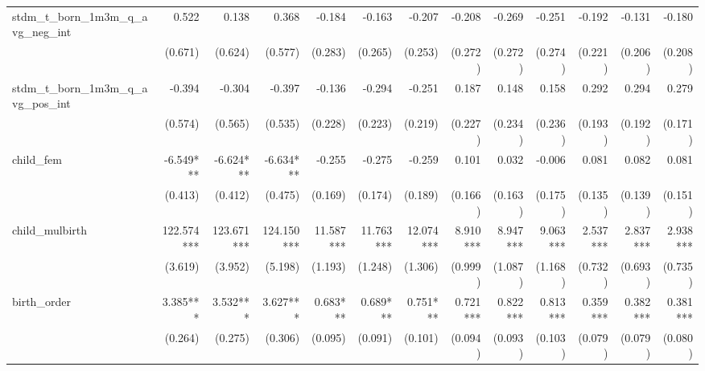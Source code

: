 \begin{tabular}{lrrrrrrrrrrrr}
stdm\_t\_born\_1m3m\_q\_avg\_neg\_int       &        0.522 &        0.138 &        0.368 &       -0.184 &       -0.163 &       -0.207 &       -0.208 &       -0.269 &       -0.251 &       -0.192 &       -0.131 &       -0.180 \\ 
                                            &      (0.671) &      (0.624) &      (0.577) &      (0.283) &      (0.265) &      (0.253) &      (0.272) &      (0.272) &      (0.274) &      (0.221) &      (0.206) &      (0.208) \\ 
stdm\_t\_born\_1m3m\_q\_avg\_pos\_int       &       -0.394 &       -0.304 &       -0.397 &       -0.136 &       -0.294 &       -0.251 &        0.187 &        0.148 &        0.158 &        0.292 &        0.294 &        0.279 \\ 
                                            &      (0.574) &      (0.565) &      (0.535) &      (0.228) &      (0.223) &      (0.219) &      (0.227) &      (0.234) &      (0.236) &      (0.193) &      (0.192) &      (0.171) \\ 
child\_fem                                  &    -6.549*** &    -6.624*** &    -6.634*** &       -0.255 &       -0.275 &       -0.259 &        0.101 &        0.032 &       -0.006 &        0.081 &        0.082 &        0.081 \\ 
                                            &      (0.413) &      (0.412) &      (0.475) &      (0.169) &      (0.174) &      (0.189) &      (0.166) &      (0.163) &      (0.175) &      (0.135) &      (0.139) &      (0.151) \\ 
child\_mulbirth                             &   122.574*** &   123.671*** &   124.150*** &    11.587*** &    11.763*** &    12.074*** &     8.910*** &     8.947*** &     9.063*** &     2.537*** &     2.837*** &     2.938*** \\ 
                                            &      (3.619) &      (3.952) &      (5.198) &      (1.193) &      (1.248) &      (1.306) &      (0.999) &      (1.087) &      (1.168) &      (0.732) &      (0.693) &      (0.735) \\ 
birth\_order                                &     3.385*** &     3.532*** &     3.627*** &     0.683*** &     0.689*** &     0.751*** &     0.721*** &     0.822*** &     0.813*** &     0.359*** &     0.382*** &     0.381*** \\ 
                                            &      (0.264) &      (0.275) &      (0.306) &      (0.095) &      (0.091) &      (0.101) &      (0.094) &      (0.093) &      (0.103) &      (0.079) &      (0.079) &      (0.080) \\ 

\end{tabular}
